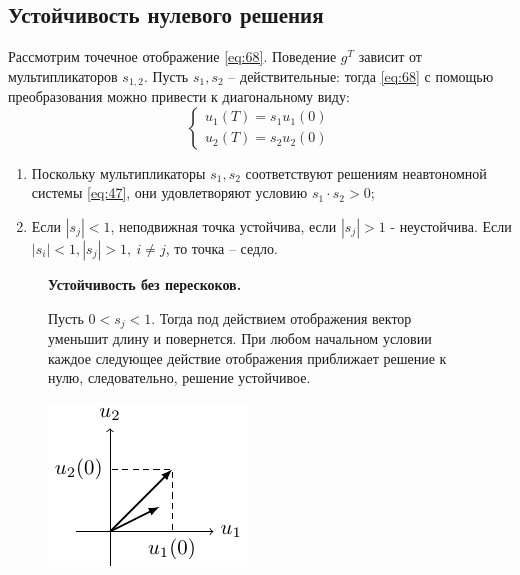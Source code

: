 \subsection{Устойчивость нулевого решения}
Рассмотрим точечное отображение \eqref{eq:68}. Поведение $g^T$ зависит от мультипликаторов $s_{1,2}$. Пусть $s_1, s_2$ -- действительные: тогда \eqref{eq:68} с помощью преобразования можно привести к диагональному виду:
\begin{equation}
	\left\{\begin{aligned}
		u_1(T)=s_1 u_1(0) \\
		u_2(T)=s_2 u_2(0)		
	\end{aligned}\right.
	\label{eq:unn}
\end{equation}
\begin{enumerate} 
	\item Поскольку мультипликаторы $s_1, s_2$ соответствуют решениям неавтономной  системы \eqref{eq:47}, они удовлетворяют условию $s_1\cdot s_2>0$;
	\item Если $|s_j|<1$, неподвижная точка устойчива, если $|s_j|>1$ - неустойчива. Если $|s_i|<1, |s_j|>1,~ i\ne j$, то точка -- седло. 
\end{enumerate} 

\begin{figure}[H]
	\centering
	\begin{minipage}{0.65\linewidth}
		\textbf{Устойчивость без перескоков. }

		Пусть $0<s_j<1$. Тогда под действием отображения вектор уменьшит длину и повернется.
		При любом начальном условии каждое следующее действие отображения приближает решение к нулю, следовательно, решение устойчивое.
	\end{minipage}
	\begin{minipage}{0.34\linewidth}
		\centering
		\includegraphics[scale=1.5]{img/parametric_oscillations/sj_1}	
	\end{minipage}		
\end{figure}

